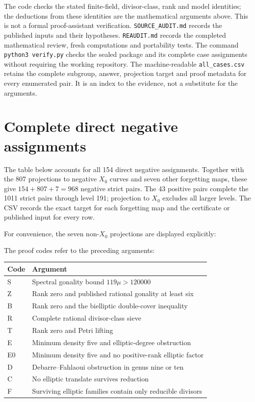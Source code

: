 \documentclass[11pt]{article}
\theoremstyle{remark}\newtheorem{remark}[theorem]{Remark}
\begin{document}
The code checks the stated finite-field, divisor-class, rank and model
identities; the deductions from these identities are the mathematical
arguments above. This is not a formal proof-assistant verification.
\texttt{SOURCE\_AUDIT.md} records the published inputs and their hypotheses.
\texttt{REAUDIT.md} records the completed mathematical review, fresh
computations and portability tests. The command \texttt{python3 verify.py}
checks the sealed package and its complete case assignments without
requiring the working repository.
The machine-readable \texttt{all\_cases.csv} retains the complete subgroup,
answer, projection target and proof metadata for every enumerated pair.
It is an index to the evidence, not a substitute for the arguments.

\appendix
\section{Complete direct negative assignments}
The table below accounts for all 154 direct negative assignments. Together
with the 807 projections to negative $X_0$ curves and seven other forgetting
maps, these give $154+807+7=968$ negative strict pairs. The 43 positive
pairs complete the 1011 strict pairs through level 191; projection to
$X_0$ excludes all larger levels. The CSV records the exact target for
each forgetting map and the certificate or published input for every row.

For convenience, the seven non-$X_0$ projections are displayed explicitly:
\begin{center}\small

\end{center}

The proof codes refer to the preceding arguments:
\begin{center}\small
\begin{tabular}{ll}\toprule
Code & Argument\\\midrule
S & Spectral gonality bound $119\mu>120000$\\
Z & Rank zero and published rational gonality at least six\\
B & Rank zero and the bielliptic double-cover inequality\\
R & Complete rational divisor-class sieve\\
T & Rank zero and Petri lifting\\
E & Minimum density five and elliptic-degree obstruction\\
E0 & Minimum density five and no positive-rank elliptic factor\\
D & Debarre--Fahlaoui obstruction in genus nine or ten\\
C & No elliptic translate survives reduction\\
F & Surviving elliptic families contain only reducible divisors\\\bottomrule
\end{tabular}
\end{center}
\begingroup\small

\endgroup
\end{document}
